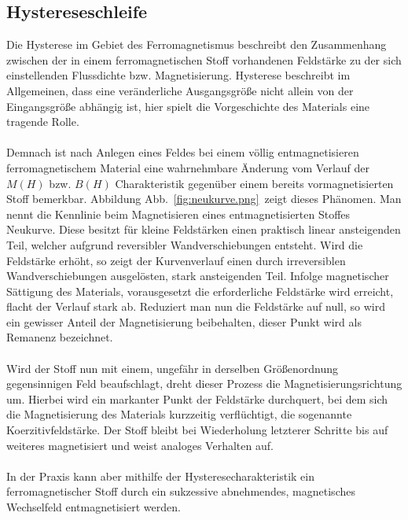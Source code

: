 \documentclass[a4paper,twoside,12pt,DIV=13,BCOR=5mm,numbers=noenddot,cleardoublepage=empty]{scrbook}
\begin{document}
        \subsection{Hystereseschleife}
        Die Hysterese im Gebiet des Ferromagnetismus beschreibt den 
        Zusammenhang zwischen der in einem ferromagnetischen Stoff vorhandenen 
        Feldst\"arke zu der sich einstellenden Flussdichte bzw. Magnetisierung. 
        Hysterese beschreibt im Allgemeinen, dass eine ver\"anderliche 
        Ausgangsgr\"o\ss{}e nicht allein von der Eingangsgr\"o\ss{}e abh\"angig ist, hier 
        spielt die Vorgeschichte des Materials eine tragende Rolle.
        \\
        \\
        Demnach ist nach Anlegen eines Feldes bei einem v\"ollig entmagnetisieren 
        ferromagnetischem Material eine wahrnehmbare \"Anderung vom Verlauf der $M(H)$ 
        bzw. $B(H)$ Charakteristik gegen\"uber einem bereits vormagnetisierten Stoff 
        bemerkbar. Abbildung Abb.~\ref{fig:neukurve.png}\, zeigt dieses Ph\"anomen. Man nennt die Kennlinie beim 
        Magnetisieren eines entmagnetisierten Stoffes Neukurve. Diese besitzt f\"ur
         kleine Feldst\"arken einen praktisch linear ansteigenden Teil, welcher 
         aufgrund reversibler Wandverschiebungen entsteht. Wird die Feldst\"arke 
         erh\"oht, so zeigt der Kurvenverlauf einen durch irreversiblen 
         Wandverschiebungen ausgel\"osten, stark ansteigenden Teil. Infolge 
         magnetischer S\"attigung des Materials, vorausgesetzt die erforderliche 
         Feldst\"arke wird erreicht, flacht der Verlauf stark ab. Reduziert man nun 
         die Feldst\"arke auf null, so wird ein gewisser Anteil der Magnetisierung 
         beibehalten, dieser Punkt wird als Remanenz bezeichnet.
        \\
        \\
        Wird der Stoff nun mit einem, ungef\"ahr in derselben Gr\"o\ss{}enordnung 
        gegensinnigen Feld beaufschlagt, dreht dieser Prozess die
        Magnetisierungsrichtung um. Hierbei wird ein markanter Punkt der 
        Feldst\"arke durchquert, bei dem sich die Magnetisierung des Materials 
        kurzzeitig verfl\"uchtigt, die sogenannte Koerzitivfeldst\"arke. Der Stoff 
        bleibt bei Wiederholung letzterer Schritte bis auf weiteres 
        magnetisiert und weist analoges Verhalten auf.
        \\
        \\
        In der Praxis kann aber mithilfe der Hysteresecharakteristik ein 
        ferromagnetischer Stoff durch ein sukzessive abnehmendes, magnetisches 
        Wechselfeld entmagnetisiert werden.
    
\end{document}
